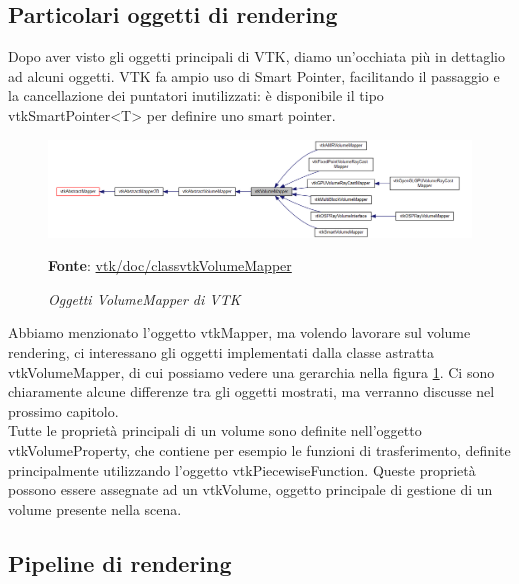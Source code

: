 \subsection{Particolari oggetti di rendering}\label{sec:special-rendering}
Dopo aver visto gli oggetti principali di VTK, diamo un'occhiata più in dettaglio ad alcuni oggetti. VTK fa ampio uso di Smart Pointer, facilitando il passaggio e la cancellazione dei puntatori inutilizzati: è disponibile il tipo vtkSmartPointer<T> per definire uno smart pointer.

\begin{figure}[h]
    \centering
    \includegraphics[scale=0.4]{immagini/volumerendering/mappers.png}
    \caption{\textit{Oggetti VolumeMapper di VTK}}
    \textbf{Fonte}: \href{https://vtk.org/doc/nightly/html/classvtkVolumeMapper.html}{vtk/doc/classvtkVolumeMapper}
    \label{fig: Gerarchia di VolumeMapper}
\end{figure}

Abbiamo menzionato l'oggetto vtkMapper, ma volendo lavorare sul volume rendering, ci interessano gli oggetti implementati dalla classe astratta vtkVolumeMapper, di cui possiamo vedere una gerarchia nella figura \ref{fig: Gerarchia di VolumeMapper}. Ci sono chiaramente alcune differenze tra gli oggetti mostrati, ma verranno discusse nel prossimo capitolo.
\\
Tutte le proprietà principali di un volume sono definite nell'oggetto vtkVolumeProperty, che contiene per esempio le funzioni di trasferimento, definite principalmente utilizzando l'oggetto vtkPiecewiseFunction. Queste proprietà possono essere assegnate ad un vtkVolume, oggetto principale di gestione di un volume presente nella scena.

\subsection{Pipeline di rendering}

